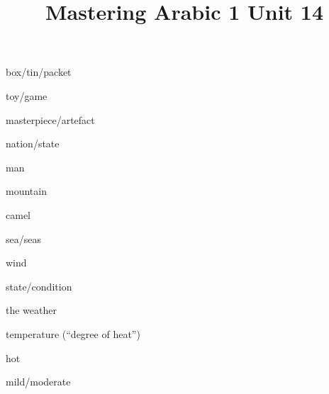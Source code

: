 \documentclass[avery5371,grid,frame]{flashcards}
\title{Mastering Arabic 1 Unit 14}
\begin{document}
\begin{flashcard}{\LARGE box/tin/packet}
\LARGE {}
\end{flashcard}
\begin{flashcard}{\LARGE toy/game}
\LARGE {}
\end{flashcard}
\begin{flashcard}{\LARGE masterpiece/artefact}
\LARGE {}
\end{flashcard}
\begin{flashcard}{\LARGE nation/state}
\LARGE {}
\end{flashcard}
\begin{flashcard}{\LARGE man}
\LARGE {}
\end{flashcard}
\begin{flashcard}{\LARGE mountain}
\LARGE {}
\end{flashcard}
\begin{flashcard}{\LARGE camel}
\LARGE {}
\end{flashcard}
\begin{flashcard}{\LARGE sea/seas}
\LARGE {}
\end{flashcard}
\begin{flashcard}{\LARGE wind}
\LARGE {}
\end{flashcard}
\begin{flashcard}{\LARGE state/condition}
\LARGE {}
\end{flashcard}
\begin{flashcard}{\LARGE the weather}
\LARGE {}
\end{flashcard}
\begin{flashcard}{\LARGE temperature (``degree of heat'')}
\LARGE {}
\end{flashcard}
\begin{flashcard}{\LARGE hot}
\LARGE {}
\end{flashcard}
\begin{flashcard}{\LARGE mild/moderate}
\LARGE {}
\end{flashcard}
\end{document}
